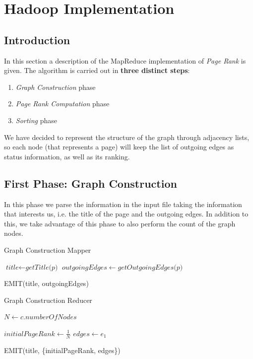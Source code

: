 \section{Hadoop Implementation}

\subsection{Introduction}
In this section a description of the MapReduce implementation of \textit{Page Rank} is given.
The algorithm is carried out in \textbf{three distinct steps}:
\begin{enumerate}
	\item \textit{Graph Construction} phase
	\item \textit{Page Rank Computation} phase
	\item \textit{Sorting} phase
\end{enumerate}

\noindent We have decided to represent the structure of the graph through adjacency lists, so each node (that represents a page) will keep the list of outgoing edges as status information, as well as its ranking.

\subsection{First Phase: Graph Construction}
In this phase we parse the information in the input file taking the information that interests us, i.e. the title of the page and the outgoing edges. In addition to this, we take advantage of this phase to also perform the count of the graph nodes.

\begin{algorithm}[H]
	\caption{Graph Construction Mapper}\label{Mapper}
		\begin{algorithmic}[1]
					\State $\textit{title} \gets \textit{getTitle(p)}$
					\State $ outgoingEdges \gets \textit{getOutgoingEdges(p)}$
		
					\State EMIT(title, outgoingEdges)
			\EndProcedure
			
			
	\end{algorithmic}
\end{algorithm}

\begin{algorithm}[H]
	\caption{Graph Construction Reducer}\label{Reducer}
		\begin{algorithmic}[1]
				\State $N \gets c.numberOfNodes$
			\EndProcedure
		
					\State $\textit{initialPageRank} \gets \frac{1}{N} $
					\State $ \textit{edges} \gets e_1$
		
					\State EMIT(title, \{initialPageRank, edges\})
				
			\EndProcedure
		\end{algorithmic}
\end{algorithm}

